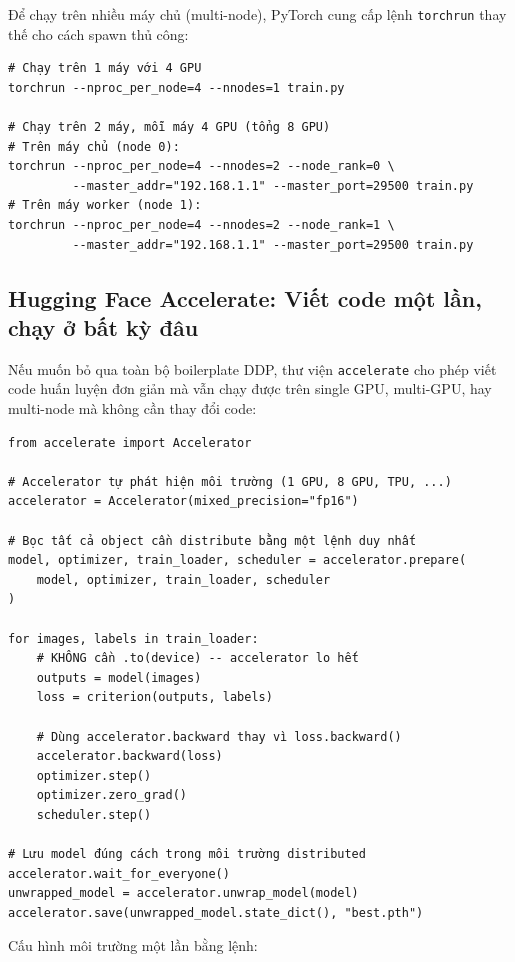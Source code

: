 Để chạy trên nhiều máy chủ (multi-node), PyTorch cung cấp lệnh \texttt{torchrun} thay thế cho cách spawn thủ công:

\begin{verbatim}
# Chạy trên 1 máy với 4 GPU
torchrun --nproc_per_node=4 --nnodes=1 train.py

# Chạy trên 2 máy, mỗi máy 4 GPU (tổng 8 GPU)
# Trên máy chủ (node 0):
torchrun --nproc_per_node=4 --nnodes=2 --node_rank=0 \
         --master_addr="192.168.1.1" --master_port=29500 train.py
# Trên máy worker (node 1):
torchrun --nproc_per_node=4 --nnodes=2 --node_rank=1 \
         --master_addr="192.168.1.1" --master_port=29500 train.py
\end{verbatim}

\subsection*{Hugging Face Accelerate: Viết code một lần, chạy ở bất kỳ đâu}

Nếu muốn bỏ qua toàn bộ boilerplate DDP, thư viện \texttt{accelerate} cho phép viết code huấn luyện đơn giản mà vẫn chạy được trên single GPU, multi-GPU, hay multi-node mà không cần thay đổi code:

\begin{verbatim}
from accelerate import Accelerator

# Accelerator tự phát hiện môi trường (1 GPU, 8 GPU, TPU, ...)
accelerator = Accelerator(mixed_precision="fp16")

# Bọc tất cả object cần distribute bằng một lệnh duy nhất
model, optimizer, train_loader, scheduler = accelerator.prepare(
    model, optimizer, train_loader, scheduler
)

for images, labels in train_loader:
    # KHÔNG cần .to(device) -- accelerator lo hết
    outputs = model(images)
    loss = criterion(outputs, labels)

    # Dùng accelerator.backward thay vì loss.backward()
    accelerator.backward(loss)
    optimizer.step()
    optimizer.zero_grad()
    scheduler.step()

# Lưu model đúng cách trong môi trường distributed
accelerator.wait_for_everyone()
unwrapped_model = accelerator.unwrap_model(model)
accelerator.save(unwrapped_model.state_dict(), "best.pth")
\end{verbatim}

Cấu hình môi trường một lần bằng lệnh:

